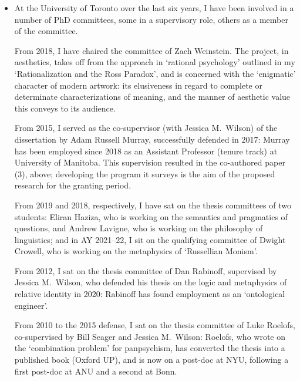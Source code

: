 \documentclass[12pt]{article}
\begin{document}
\begin{itemize}
	\item[] At the University of Toronto over the last six years, I have been involved in a number of PhD committees, some in a supervisory role, others as a member of the committee.
	
	From 2018, I have chaired the committee of Zach Weinstein. The project, in aesthetics, takes off from the approach in `rational psychology' outlined in my `Rationalization and the Ross Paradox', and is concerned with the `enigmatic' character of modern artwork: its elusiveness in regard to complete or determinate characterizations of meaning, and the manner of aesthetic value this conveys to its audience.
	
	From 2015, I served as the co-supervisor (with Jessica M.\ Wilson) of the dissertation by Adam Russell Murray, successfully defended in 2017: Murray has been employed since 2018 as an Assistant Professor (tenure track) at University of Manitoba. This supervision resulted in the co-authored paper (3), above; developing the program it surveys is the aim of the proposed research for the granting period.
	
	From 2019 and 2018, respectively, I have sat on the thesis committees of two students: Eliran Haziza, who is working on the semantics and pragmatics of questions, and Andrew Lavigne, who is working on the philosophy of linguistics; and in AY 2021--22, I sit on the qualifying committee of Dwight Crowell, who is working on the metaphysics of `Russellian Monism'.
	
	From 2012, I sat on the thesis committee of Dan Rabinoff, supervised by Jessica M.\ Wilson, who defended his thesis on the logic and metaphysics of relative identity in 2020: Rabinoff has found employment as an `ontological engineer'.
	
	From 2010 to the 2015 defense, I sat on the thesis committee of Luke Roelofs, co-supervised by Bill Seager and Jessica M.~Wilson: Roelofs, who wrote on the `combination problem' for panpsychism, has converted the thesis into a published book (Oxford UP), and is now on a post-doc at NYU, following a first post-doc at ANU and a second at Bonn.
	

	
	
	
	
\end{itemize}
\end{document}

